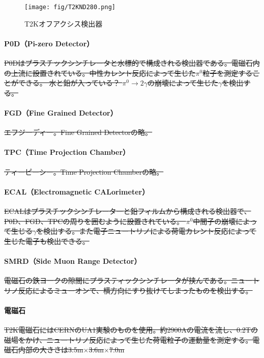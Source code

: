 \documentclass[11pt]{ltjsreport}
\begin{document}
\begin{figure}[htbp]
\centering
\texttt{[image: fig/T2KND280.png]}
\caption[T2Kオフアクシス検出器]{T2Kオフアクシス検出器}
\label{TOAD}
\end{figure}

\paragraph{P0D（Pi-zero Detector）}
\sout{P0Dはプラスチックシンチレータと水標的で構成される検出器である。電磁石内の上流に設置されている。中性カレント反応によって生じた$\pi^{0}$粒子を測定することができる。
水と鉛が入っている？
%
$\pi^{0} \rightarrow 2 \gamma$の崩壊によって生じた$\gamma$を検出する。}

\paragraph{FGD（Fine Grained Detector）}
\sout{エフジーディー。Fine Grained Detectorの略。}

\paragraph{TPC（Time Projection Chamber）}
\sout{ティーピーシー。Time Projection Chamberの略。}

\paragraph{ECAL（Electromagnetic CALorimeter）}
\sout{ECALはプラスチックシンチレーターと鉛フィルムから構成される検出器で、P0D、FGD、TPCの周りを囲むように設置されている。
$\pi^{0}$中間子の崩壊によって生じる$\gamma$を検出する。また電子ニュートリノによる荷電カレント反応によって生じた電子も検出できる。}

\paragraph{SMRD（Side Muon Range Detector）}
\sout{電磁石の鉄ヨークの隙間にプラスティックシンチレータが挟んである。ニュートリノ反応によるミューオンで、横方向にすり抜けてしまったものを検出する。}

\paragraph{電磁石}
\sout{T2K電磁石にはCERNのUA1実験のものを使用。約2900Aの電流を流し、0.2Tの磁場をかけ、ニュートリノ反応によって生じた荷電粒子の運動量を測定する。電磁石内部の大きさは3.5m$\times$3.6m$\times$7.0m}
\end{document}

